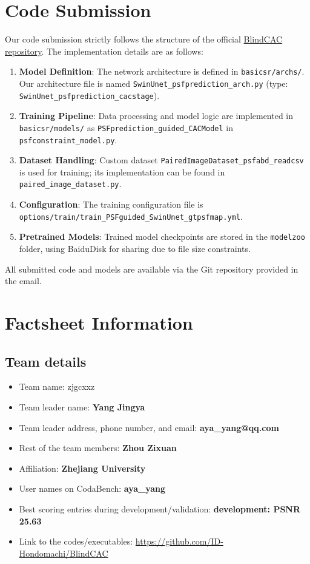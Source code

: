 \documentclass[10pt,twocolumn,letterpaper]{article}
\begin{document}
\section{Code Submission}
Our code submission strictly follows the structure of the official \href{https://github.com/zju-jiangqi/BlindCAC}{BlindCAC repository}. The implementation details are as follows:
\begin{enumerate}
    \item \textbf{Model Definition}: The network architecture is defined in \texttt{basicsr/archs/}. Our architecture file is named \texttt{SwinUnet\_psfprediction\_arch.py} (type: \texttt{SwinUnet\_psfprediction\_cacstage}).
    \item \textbf{Training Pipeline}: Data processing and model logic are implemented in \texttt{basicsr/models/} as \texttt{PSFprediction\_guided\_CACModel} in \texttt{psfconstraint\_model.py}.
    \item \textbf{Dataset Handling}: Custom dataset \texttt{PairedImageDataset\_psfabd\_readcsv} is used for training; its implementation can be found in \texttt{paired\_image\_dataset.py}.
    \item \textbf{Configuration}: The training configuration file is \texttt{options/train/train\_PSFguided\_SwinUnet\_gtpsfmap.yml}.
    \item \textbf{Pretrained Models}: Trained model checkpoints are stored in the \texttt{modelzoo} folder, using BaiduDisk for sharing due to file size constraints.
\end{enumerate}
All submitted code and models are available via the Git repository provided in the email.

\section{Factsheet Information}

\subsection{Team details}
\begin{itemize}
    \item Team name: zjgcxxz
    \item Team leader name: \textbf{Yang Jingya}
    \item Team leader address, phone number, and email: \textbf{aya\_yang@qq.com}
    \item Rest of the team members: \textbf{Zhou Zixuan}
    \item Affiliation: \textbf{Zhejiang University}
    \item User names on CodaBench: \textbf{aya\_yang}
    \item Best scoring entries during development/validation: \textbf{development: PSNR 25.63}
    \item Link to the codes/executables: \url{https://github.com/ID-Hondomachi/BlindCAC}
\end{itemize}
\end{document}
